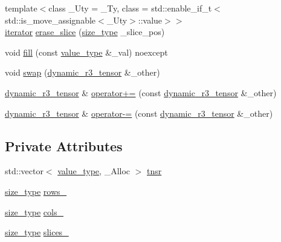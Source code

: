 \begin{DoxyCompactItemize}
\item 
{\footnotesize template$<$class \+\_\+\+Uty  = \+\_\+\+Ty, class  = std\+::enable\+\_\+if\+\_\+t$<$std\+::is\+\_\+move\+\_\+assignable$<$\+\_\+\+Uty$>$\+::value$>$$>$ }\\\hyperlink{classcrsc_1_1dynamic__r3__tensor_a8da8f1c3ec1cde63d7693e41c9e7f496}{iterator} \hyperlink{classcrsc_1_1dynamic__r3__tensor_a4a9871a0c07d97c070d3ed4ccc255bcb}{erase\+\_\+slice} (\hyperlink{classcrsc_1_1dynamic__r3__tensor_a00e5f1f46f16d0c0ac1cffa6bd0fe862}{size\+\_\+type} \+\_\+slice\+\_\+pos)
\item 
void \hyperlink{classcrsc_1_1dynamic__r3__tensor_a98dfe10142fe28003f4dd06760f0f505}{fill} (const \hyperlink{classcrsc_1_1dynamic__r3__tensor_ad7fb44388c819fb7947771da18bb625b}{value\+\_\+type} \&\+\_\+val) noexcept
\item 
void \hyperlink{classcrsc_1_1dynamic__r3__tensor_a97d28ecea9f0cb403b0a7b5df275e17c}{swap} (\hyperlink{classcrsc_1_1dynamic__r3__tensor}{dynamic\+\_\+r3\+\_\+tensor} \&\+\_\+other)
\item 
\hyperlink{classcrsc_1_1dynamic__r3__tensor}{dynamic\+\_\+r3\+\_\+tensor} \& \hyperlink{classcrsc_1_1dynamic__r3__tensor_a17cf2f7f2181d92389c07d191a8e8816}{operator+=} (const \hyperlink{classcrsc_1_1dynamic__r3__tensor}{dynamic\+\_\+r3\+\_\+tensor} \&\+\_\+other)
\item 
\hyperlink{classcrsc_1_1dynamic__r3__tensor}{dynamic\+\_\+r3\+\_\+tensor} \& \hyperlink{classcrsc_1_1dynamic__r3__tensor_af9aeb492230eea89d91345940d38ed12}{operator-\/=} (const \hyperlink{classcrsc_1_1dynamic__r3__tensor}{dynamic\+\_\+r3\+\_\+tensor} \&\+\_\+other)
\end{DoxyCompactItemize}
\subsection*{Private Attributes}
\begin{DoxyCompactItemize}
\item 
std\+::vector$<$ \hyperlink{classcrsc_1_1dynamic__r3__tensor_ad7fb44388c819fb7947771da18bb625b}{value\+\_\+type}, \+\_\+\+Alloc $>$ \hyperlink{classcrsc_1_1dynamic__r3__tensor_ab67d8f937b860e12cb09ae613062f14e}{tnsr}
\item 
\hyperlink{classcrsc_1_1dynamic__r3__tensor_a00e5f1f46f16d0c0ac1cffa6bd0fe862}{size\+\_\+type} \hyperlink{classcrsc_1_1dynamic__r3__tensor_a737d9127d05b3c2537c96c19d813f64c}{rows\+\_\+}
\item 
\hyperlink{classcrsc_1_1dynamic__r3__tensor_a00e5f1f46f16d0c0ac1cffa6bd0fe862}{size\+\_\+type} \hyperlink{classcrsc_1_1dynamic__r3__tensor_af4a4b9c7904f95c87be7984c4c3e5dc4}{cols\+\_\+}
\item 
\hyperlink{classcrsc_1_1dynamic__r3__tensor_a00e5f1f46f16d0c0ac1cffa6bd0fe862}{size\+\_\+type} \hyperlink{classcrsc_1_1dynamic__r3__tensor_aa7f93a1920c579b47fe3c9c2380ae53a}{slices\+\_\+}
\end{DoxyCompactItemize}


